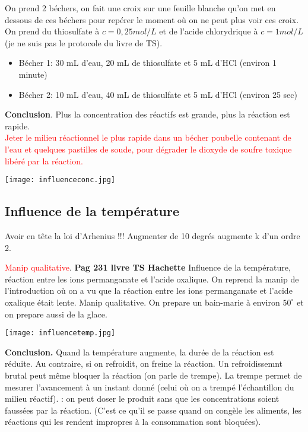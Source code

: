 \documentclass{article}
\begin{document}
On prend 2 béchers, on fait une croix sur une feuille blanche qu'on met en dessous de ces béchers pour repérer le moment où on ne peut plus voir ces croix. On prend du thiosulfate à $c = 0,25 mol/L$ et de l'acide chlorydrique à $c=1 mol/L$ (je ne suis pas le protocole du livre de TS).

\begin{itemize}
    \item Bécher 1: 30 mL d'eau, 20 mL de thiosulfate et 5 mL  d'HCl (environ 1 minute)
    \item Bécher 2: 10 mL d'eau, 40 mL de thiosulfate et 5 mL  d'HCl (environ 25 sec)
\end{itemize}

\textbf{Conclusion}. Plus la concentration des réactifs est grande, plus la réaction est rapide.\\

\textcolor{red}{Jeter le milieu réactionnel le plus rapide dans un bécher poubelle contenant de l'eau et quelques pastilles de soude, pour dégrader le dioxyde de soufre toxique libéré par la réaction.}

\begin{center}
    \texttt{[image: influenceconc.jpg]}
\end{center}

\subsection{Influence de la température}

Avoir en tête la loi d'Arhenius !!! Augmenter de 10 degrés augmente k d'un ordre 2.

\textcolor{red}{Manip qualitative}. \textbf{Pag 231 livre TS Hachette} Influence de la température, réaction entre les ions permanganate et l'acide oxalique. On reprend la manip de l'introduction où on a vu que la réaction entre les ions permanganate et l'acide oxalique était lente. Manip qualitative. On prepare un bain-marie à environ $50^{\circ}$ et on prepare aussi de la glace.

\begin{center}
    \texttt{[image: influencetemp.jpg]}
\end{center}

\textbf{Conclusion.} Quand la température augmente, la durée de la réaction est réduite. Au contraire, si on refroidit, on freine la réaction. Un refroidissemnt brutal peut même bloquer la réaction (on parle de trempe). La trempe permet de mesurer l'avancement à un instant donné (celui où on a trempé l'échantillon du milieu réactif). : on peut doser le produit sans que les concentrations soient faussées par la réaction. (C'est ce qu'il se passe quand on congèle les aliments, les réactions qui les rendent impropres à la consommation sont bloquées).\\
\end{document}
